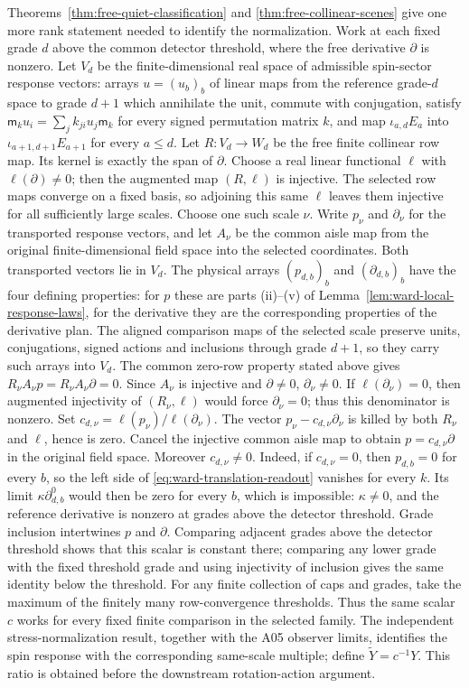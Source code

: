 Theorems~\ref{thm:free-quiet-classification} and
\ref{thm:free-collinear-scenes} give one more rank statement needed to
identify the normalization.  Work at each fixed grade $d$ above the common detector
threshold, where the free derivative $\partial$ is nonzero.  Let $V_d$ be
the finite-dimensional real space of admissible spin-sector response
vectors: arrays $u=(u_b)_b$ of linear maps from the reference grade-$d$
space to grade $d+1$ which annihilate the unit, commute with conjugation,
satisfy $\mathsf m_ku_i=\sum_jk_{ji}u_j\mathsf m_k$ for every signed
permutation matrix $k$, and map $\iota_{a,d}E_a$ into
$\iota_{a+1,d+1}E_{a+1}$ for every $a\le d$.  Let $R:V_d\to W_d$ be the free finite collinear row map.  Its kernel is
exactly the span of $\partial$.  Choose a real linear functional $\ell$ with
$\ell(\partial)\ne0$; then the augmented map $(R,\ell)$ is injective.
The selected row maps converge on a fixed basis, so adjoining this same
$\ell$ leaves them injective for all sufficiently large scales.  Choose one
such scale $\nu$.  Write $p_\nu$ and $\partial_\nu$ for the transported
response vectors, and let $A_\nu$ be the common aisle map from the original
finite-dimensional field space into the selected coordinates.  Both
transported vectors lie in $V_d$.  The physical arrays $(p_{d,b})_b$ and
$(\partial_{d,b})_b$ have the four defining properties: for $p$ these are
parts (ii)--(v) of Lemma~\ref{lem:ward-local-response-laws}, for the
derivative they are the corresponding properties of the derivative plan.
The aligned comparison maps of the selected scale preserve units,
conjugations, signed actions and inclusions through grade $d+1$, so they
carry such arrays into $V_d$. The common zero-row property stated above
gives $R_\nu A_\nu p=R_\nu A_\nu\partial=0$.  Since
$A_\nu$ is injective and $\partial\ne0$, $\partial_\nu\ne0$.  If
$\ell(\partial_\nu)=0$, then augmented injectivity of
$(R_\nu,\ell)$ would force $\partial_\nu=0$; thus this denominator is
nonzero.  Set $c_{d,\nu}=\ell(p_\nu)/\ell(\partial_\nu)$.  The
vector $p_\nu-c_{d,\nu}\partial_\nu$ is killed by both $R_\nu$ and
$\ell$, hence is zero.  Cancel the injective common aisle map to obtain
$p=c_{d,\nu}\partial$ in the original field space.  Moreover
$c_{d,\nu}\ne0$.  Indeed, if $c_{d,\nu}=0$, then $p_{d,b}=0$ for every
$b$, so the left side of \eqref{eq:ward-translation-readout} vanishes for
every $k$.  Its limit $\kappa\partial^0_{d,b}$ would then be zero for every
$b$, which is impossible: $\kappa\ne0$, and the reference derivative is
nonzero at grades above the detector threshold.  Grade inclusion intertwines $p$ and $\partial$.
Comparing adjacent grades above the detector threshold shows that this
scalar is constant there; comparing any lower grade with the fixed threshold
grade and using injectivity of inclusion gives the same identity below the
threshold.  For any finite collection of caps and grades, take the maximum
of the finitely many row-convergence thresholds.  Thus the same scalar $c$
works for every fixed finite comparison in the selected family.  The independent
stress-normalization result, together with the A05 observer limits,
identifies the spin response with the corresponding same-scale multiple;
define $\widetilde Y=c^{-1}Y$.  This ratio is obtained before the downstream
rotation-action argument.

